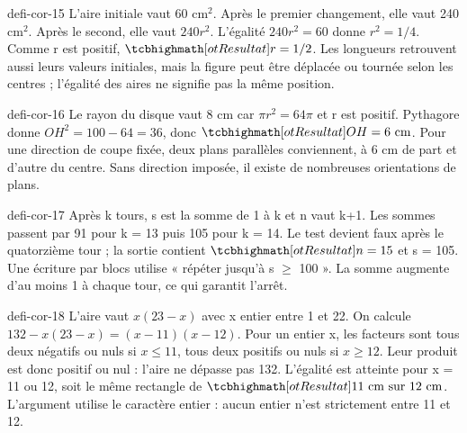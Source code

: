 \begin{blocEdition}{defi-cor-15}
L’aire initiale vaut 60 cm$^2$. Après le premier changement, elle vaut 240 cm$^2$. Après le second, elle vaut $240r^2$. L’égalité $240r^2=60$ donne $r^2=1/4$. Comme r est positif, $\res{r=1/2}$. Les longueurs retrouvent aussi leurs valeurs initiales, mais la figure peut être déplacée ou tournée selon les centres ; l’égalité des aires ne signifie pas la même position.\label{fig-defi-cor-15}

\end{blocEdition}
\begin{blocEdition}{defi-cor-16}
Le rayon du disque vaut 8 cm car $\pi r^2=64\pi$ et r est positif. Pythagore donne $OH^2=100-64=36$, donc $\res{OH=6\text{ cm}}$. Pour une direction de coupe fixée, deux plans parallèles conviennent, à 6 cm de part et d’autre du centre. Sans direction imposée, il existe de nombreuses orientations de plans.\label{fig-defi-cor-16}

\end{blocEdition}
\begin{blocEdition}{defi-cor-17}
Après k tours, s est la somme de 1 à k et n vaut k+1. Les sommes passent par 91 pour k = 13 puis 105 pour k = 14. Le test devient faux après le quatorzième tour ; la sortie contient $\res{n=15}$ et s = 105. Une écriture par blocs utilise « répéter jusqu’à s $\ge$ 100 ». La somme augmente d’au moins 1 à chaque tour, ce qui garantit l’arrêt.
\end{blocEdition}
\begin{blocEdition}{defi-cor-18}
L’aire vaut $x(23-x)$ avec x entier entre 1 et 22. On calcule $132-x(23-x)=(x-11)(x-12)$. Pour un entier x, les facteurs sont tous deux négatifs ou nuls si $x\le11$, tous deux positifs ou nuls si $x\ge12$. Leur produit est donc positif ou nul : l’aire ne dépasse pas 132. L’égalité est atteinte pour x = 11 ou 12, soit le même rectangle de $\res{11\text{ cm sur }12\text{ cm}}$. L’argument utilise le caractère entier : aucun entier n’est strictement entre 11 et 12.
\end{blocEdition}
